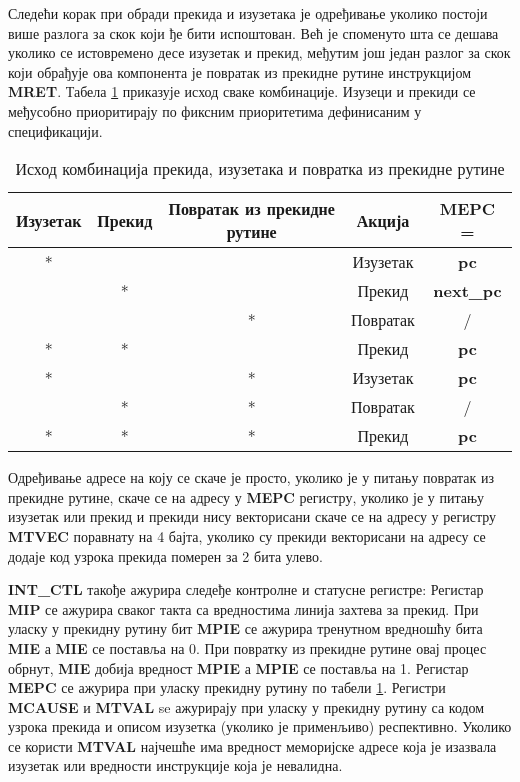 Следећи корак при обради прекида и изузетака је одређивање уколико постоји више разлога за скок који ђе бити испоштован. Већ је споменуто шта се дешава уколико се истовремено десе изузетак и прекид, међутим још један разлог за скок који обрађује ова компонента је повратак из прекидне рутине инструкцијом \textbf{MRET}. Табела \ref{tab:int} приказује исход сваке комбинације. Изузеци и прекиди се међусобно приоритирају по фиксним приоритетима дефинисаним у спецификацији\cite{priv_spec}.

\begin{table}[h!]
	\centering
	\caption{Исход комбинација прекида, изузетака и повратка из прекидне рутине}
	\label{tab:int}
\begin{tabular}{|c|c|c|c|c|}
	\hline
	Изузетак & Прекид & Повратак из прекидне рутине & Акција & \textbf{\acrshort{MEPC}} = \\
	\hline
	* &  &  & Изузетак & \textbf{pc} \\
	\hline
	& * &  & Прекид & \textbf{next\_pc} \\
	\hline
	&  & * & Повратак & / \\
	\hline
	* & * &  & Прекид & \textbf{pc} \\
	\hline
	* &  & * & Изузетак & \textbf{pc} \\
	\hline
	& * & * & Повратак & / \\
	\hline
	* & * & * & Прекид & \textbf{pc} \\
	\hline
\end{tabular}
\end{table}

Одређивање адресе на коју се скаче је просто, уколико је у питању повратак из прекидне рутине, скаче се на адресу у \textbf{\acrshort{MEPC}} регистру, уколико је у питању изузетак или прекид и прекиди нису векторисани скаче се на адресу у регистру \textbf{MTVEC} поравнату на 4 бајта, уколико су прекиди векторисани на адресу се додаје код узрока прекида померен за 2 бита улево.

\textbf{INT\_CTL} такође ажурира следеђе контролне и статусне регистре:
Регистар \textbf{\acrshort{MIP}} се ажурира сваког такта са вредностима линија захтева за прекид.
При уласку у прекидну рутину бит \textbf{\acrshort{MPIE}} се ажурира тренутном вредношћу бита \textbf{\acrshort{MIE}} а \textbf{\acrshort{MIE}} се поставља на 0.
При повратку из прекидне рутине овај процес обрнут, \textbf{\acrshort{MIE}} добија вредност \textbf{\acrshort{MPIE}} а \textbf{\acrshort{MPIE}} се поставља на 1.
Регистар \textbf{\acrshort{MEPC}} се ажурира при уласку прекидну рутину по табели \ref{tab:int}.
Регистри \textbf{\acrshort{MCAUSE}} и \textbf{\acrshort{MTVAL}} se ажурирају при уласку у прекидну рутину са кодом узрока прекида и описом изузетка (уколико је применљиво) респективно.
Уколико се користи \textbf{\acrshort{MTVAL}} најчешће има вредност меморијске адресе која је изазвала изузетак или вредности инструкције која је невалидна.